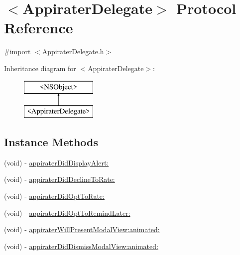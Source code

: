 \hypertarget{protocol_appirater_delegate-p}{\section{$<$Appirater\-Delegate$>$ Protocol Reference}
\label{protocol_appirater_delegate-p}
}


{\ttfamily \#import $<$Appirater\-Delegate.\-h$>$}

Inheritance diagram for $<$Appirater\-Delegate$>$\-:\begin{figure}[H]
\begin{center}
\leavevmode
\includegraphics[height=2.000000cm]{protocol_appirater_delegate-p}
\end{center}
\end{figure}
\subsection*{Instance Methods}
\begin{DoxyCompactItemize}
\item 
(void) -\/ \hyperlink{protocol_appirater_delegate-p_a28b0c8d842008c18b4ed489ad3fc0615}{appirater\-Did\-Display\-Alert\-:}
\item 
(void) -\/ \hyperlink{protocol_appirater_delegate-p_acec43ec6afbc30ab77c63e387bd2b5c9}{appirater\-Did\-Decline\-To\-Rate\-:}
\item 
(void) -\/ \hyperlink{protocol_appirater_delegate-p_acad92c38d69687ceea50ff2eedc44d02}{appirater\-Did\-Opt\-To\-Rate\-:}
\item 
(void) -\/ \hyperlink{protocol_appirater_delegate-p_a22c0ea09389deae35d095b2ce9429e83}{appirater\-Did\-Opt\-To\-Remind\-Later\-:}
\item 
(void) -\/ \hyperlink{protocol_appirater_delegate-p_a9d0c0ce61a8273f14d96b69d5a78a50c}{appirater\-Will\-Present\-Modal\-View\-:animated\-:}
\item 
(void) -\/ \hyperlink{protocol_appirater_delegate-p_a90686f98bc59bd8c81f360d1fa198c60}{appirater\-Did\-Dismiss\-Modal\-View\-:animated\-:}
\end{DoxyCompactItemize}



